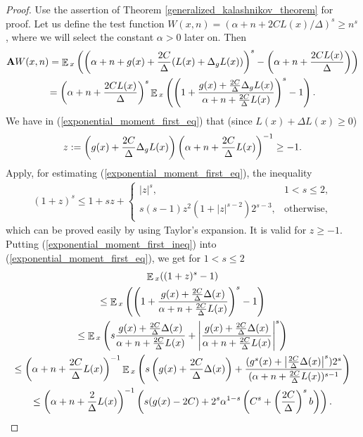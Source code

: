 \documentclass[10pt, reqno]{amsart}
\theoremstyle{definition}
\newcommand{\wtfVar}{W} %
\newcommand{\atoVar}{\mathbf{A}} %
\newcommand{\ltfVar}{L} %
\newcommand{\absolute}[1]{\left|#1\right|}
\DeclareMathOperator*{\E}{\mathbb{E}}
\begin{document}
	\begin{proof}
		Use the assertion of Theorem \ref{generalized_kalashnikov_theorem} for proof. Let us define the test function $\wtfVar(x, n) = (\alpha + n + 2C\ltfVar(x) / \Delta)^{s} \geq n^{s}$, where we will select the constant $\alpha > 0$ later on. Then
		\begin{gather}
		\atoVar\wtfVar(x, n) = \E{}_{x}\left(\left(\alpha + n + \gffVar(x) + \frac{2C}{\Delta}(\ltfVar(x) + \Delta_{\gffVar}\ltfVar(x))\right)^{s} - \left(\alpha + n + \frac{2C\ltfVar(x)}{\Delta}\right)\right) \notag\\ = \left(\alpha + n + \frac{2C\ltfVar(x)}{\Delta}\right)^{s}\E{}_{x}\left(\left(1 + \frac{\gffVar(x) + \frac{2C}{\Delta}\Delta_{\gffVar}\ltfVar(x)}{\alpha + n + \frac{2C}{\Delta}\ltfVar(x)}\right)^{s} - 1\right).
		\label{exponential_moment_first_eq}
		\end{gather}
		We have in (\ref{exponential_moment_first_eq}) that (since $\ltfVar(x) + \Delta\ltfVar(x) \geq 0$)
		\begin{gather*}
		z := \left(\gffVar(x) + \frac{2C}{\Delta}\Delta_{\gffVar}\ltfVar(x)\right)\left(\alpha + n + \frac{2C}{\Delta}\ltfVar(x)\right)^{-1} \geq -1.
		\end{gather*}
		Apply, for estimating (\ref{exponential_moment_first_eq}), the inequality
		\begin{gather}
		(1 + z)^{s} \leq 1 + sz + \begin{cases}
		\absolute{z}^{s}, & 1 < s \leq 2,\\
		s(s-1)z^{2}(1 + \absolute{z}^{s-2})2^{s-3}, & \text{otherwise},
		\end{cases}
		\label{exponential_moment_first_ineq}
		\end{gather}
		which can be proved easily by using Taylor's expansion. It is valid for $z \geq -1$. Putting (\ref{exponential_moment_first_ineq}) into (\ref{exponential_moment_first_eq}), we get for $1 < s \leq 2$
		\begin{gather}
		\E{}_{x}((1 + z)^{s} - 1) \notag\\ \leq \E{}_{x}\left(\left(1 + \frac{\gffVar(x) + \frac{2C}{\Delta}\Delta(x)}{\alpha + n + \frac{2C}{\Delta}\ltfVar(x)}\right)^{s} - 1\right) \notag\\ \leq \E{}_{x}\left(s\frac{\gffVar(x) + \frac{2C}{\Delta}\Delta(x)}{\alpha + n + \frac{2C}{\Delta}\ltfVar(x)} + \absolute{\frac{\gffVar(x) + \frac{2C}{\Delta}\Delta(x)}{\alpha + n + \frac{2C}{\Delta}\ltfVar(x)}}^{s}\right) \notag\\ \leq \left(\alpha + n + \frac{2C}{\Delta}\ltfVar(x)\right)^{-1}\E{}_{x}\left(s\left(\gffVar(x) + \frac{2C}{\Delta}\Delta(x)\right) + \frac{(\gffVar^{s}(x) + \absolute{\frac{2C}{\Delta}\Delta(x)}^{s})2^{s}}{(\alpha + n + \frac{2C}{\Delta}\ltfVar(x))^{s-1}}\right) \notag\\ \leq \left(\alpha + n + \frac{2}{\Delta}\ltfVar(x)\right)^{-1}\left(s(\gffVar(x) - 2C) + 2^{s}\alpha^{1-s}\left(C^{s} + \left(\frac{2C}{\Delta}\right)^{s}b\right)\right).

\end{gather}
\end{proof}
\end{document}
